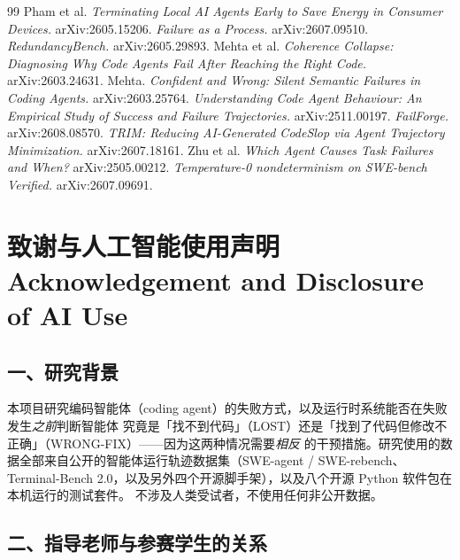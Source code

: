 \documentclass[10pt]{article}
\begin{document}
\newpage
\begin{thebibliography}{99}\small
{} Pham et al. \emph{Terminating Local AI Agents Early to Save Energy in Consumer
Devices.} arXiv:2605.15206.
 \emph{Failure as a Process.} arXiv:2607.09510.
 \emph{RedundancyBench.} arXiv:2605.29893.
 Mehta et al. \emph{Coherence Collapse: Diagnosing Why Code Agents Fail After
Reaching the Right Code.} arXiv:2603.24631.
 Mehta. \emph{Confident and Wrong: Silent Semantic Failures in Coding
Agents.} arXiv:2603.25764.
 \emph{Understanding Code Agent Behaviour: An Empirical Study of Success and
Failure Trajectories.} arXiv:2511.00197.
 \emph{FailForge.} arXiv:2608.08570.
 \emph{TRIM: Reducing AI-Generated CodeSlop via Agent Trajectory Minimization.}
arXiv:2607.18161.
 Zhu et al. \emph{Which Agent Causes Task Failures and When?} arXiv:2505.00212.
 \emph{Temperature-0 nondeterminism on SWE-bench Verified.} arXiv:2607.09691.
\end{thebibliography}

\newpage
\section*{致谢与人工智能使用声明\\\large Acknowledgement and Disclosure of AI Use}

\subsection*{一、研究背景}

本项目研究编码智能体（coding agent）的失败方式，以及运行时系统能否在失败发生\emph{之前}判断智能体
究竟是「找不到代码」（LOST）还是「找到了代码但修改不正确」（WRONG-FIX）——因为这两种情况需要\emph{相反}
的干预措施。研究使用的数据全部来自公开的智能体运行轨迹数据集（SWE-agent / SWE-rebench、
Terminal-Bench 2.0，以及另外四个开源脚手架），以及八个开源 Python 软件包在本机运行的测试套件。
不涉及人类受试者，不使用任何非公开数据。

\subsection*{二、指导老师与参赛学生的关系}
\end{document}
